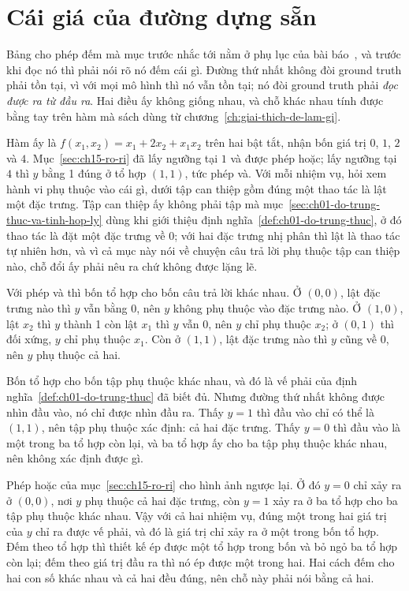 \section{Cái giá của đường dựng sẵn}
\label{sec:ch16-gia-duong-dung-san}

%
Bảng cho phép đếm mà mục trước nhắc tới nằm ở phụ lục của bài
báo~\autocite{p21metrics}, và trước khi đọc nó thì phải nói rõ nó đếm cái gì.
Đường thứ nhất không đòi ground truth phải tồn tại, vì với mọi mô hình thì nó
vẫn tồn tại; nó đòi ground truth phải \emph{đọc được ra từ đầu ra}. Hai điều ấy
không giống nhau, và chỗ khác nhau tính được bằng tay trên hàm mà sách dùng từ
chương~\ref{ch:giai-thich-de-lam-gi}.

%
Hàm ấy là $f(x_1,x_2) = x_1 + 2x_2 + x_1x_2$ trên hai
 bật tắt, nhận bốn giá trị $0$, $1$, $2$ và $4$.
Mục~\ref{sec:ch15-ro-ri} đã lấy ngưỡng tại $1$ và được phép hoặc; lấy ngưỡng tại
$4$ thì $y$ bằng 1 đúng ở tổ hợp $(1,1)$, tức phép và. Với mỗi nhiệm vụ, hỏi
xem hành vi phụ thuộc vào cái gì, dưới tập can thiệp gồm đúng một thao tác là
lật một đặc trưng. Tập can thiệp ấy không phải tập mà
mục~\ref{sec:ch01-do-trung-thuc-va-tinh-hop-ly} dùng khi giới thiệu định
nghĩa~\ref{def:ch01-do-trung-thuc}, ở đó thao tác là đặt một đặc trưng về 0; với
hai đặc trưng nhị phân thì lật là thao tác tự nhiên hơn, và vì cả mục này nói về
chuyện câu trả lời phụ thuộc tập can thiệp nào, chỗ đổi ấy phải nêu ra chứ không
được lặng lẽ.

Với phép và thì bốn tổ hợp cho bốn câu trả lời khác nhau. Ở $(0,0)$, lật đặc
trưng nào thì $y$ vẫn bằng 0, nên $y$ không phụ thuộc vào đặc trưng nào. Ở
$(1,0)$, lật $x_2$ thì $y$ thành 1 còn lật $x_1$ thì $y$ vẫn 0, nên $y$ chỉ phụ
thuộc $x_2$; ở $(0,1)$ thì đối xứng, $y$ chỉ phụ thuộc $x_1$. Còn ở $(1,1)$, lật
đặc trưng nào thì $y$ cũng về 0, nên $y$ phụ thuộc cả hai.

Bốn tổ hợp cho bốn tập phụ thuộc khác nhau, và đó là vế phải của
định nghĩa~\ref{def:ch01-do-trung-thuc} đã biết đủ. Nhưng đường thứ nhất không
được nhìn đầu vào, nó chỉ được nhìn đầu ra. Thấy $y = 1$ thì đầu vào chỉ có thể
là $(1,1)$, nên tập phụ thuộc xác định: cả hai đặc trưng. Thấy $y = 0$ thì đầu
vào là một trong ba tổ hợp còn lại, và ba tổ hợp ấy cho ba tập phụ thuộc khác
nhau, nên không xác định được gì.

Phép hoặc của mục~\ref{sec:ch15-ro-ri} cho hình ảnh ngược lại. Ở đó $y = 0$ chỉ
xảy ra ở $(0,0)$, nơi $y$ phụ thuộc cả hai đặc trưng, còn $y = 1$ xảy ra ở ba
tổ hợp cho ba tập phụ thuộc khác nhau. Vậy với cả hai nhiệm vụ, đúng một trong
hai giá trị của $y$ chỉ ra được vế phải, và đó là giá trị chỉ xảy ra ở một trong
bốn tổ hợp. Đếm theo tổ hợp thì thiết kế ép được một tổ hợp trong bốn và bỏ ngỏ
ba tổ hợp còn lại; đếm theo giá trị đầu ra thì nó ép được một trong hai. Hai
cách đếm cho hai con số khác nhau và cả hai đều đúng, nên chỗ này phải nói bằng
cả hai.

